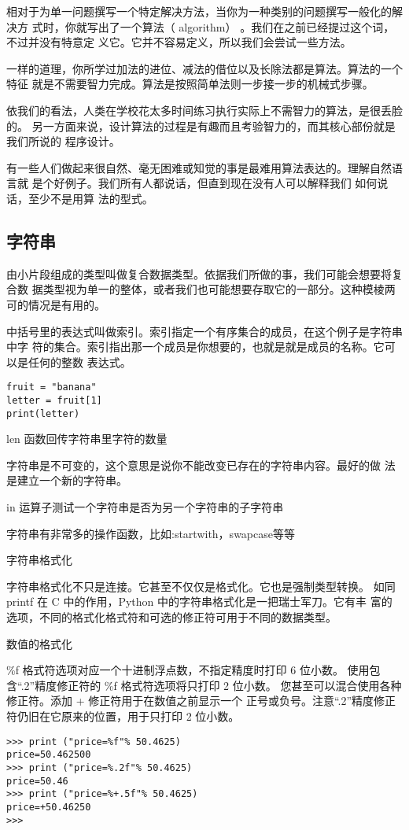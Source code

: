 \documentclass[twoside,11pt]{book}
\begin{document}
相对于为单一问题撰写一个特定解决方法，当你为一种类别的问题撰写一般化的解决方
式时，你就写出了一个算法（ algorithm） 。我们在之前已经提过这个词，不过并没有特意定
义它。它并不容易定义，所以我们会尝试一些方法。

一样的道理，你所学过加法的进位、减法的借位以及长除法都是算法。算法的一个特征
就是不需要智力完成。算法是按照简单法则一步接一步的机械式步骤。

依我们的看法，人类在学校花太多时间练习执行实际上不需智力的算法，是很丢脸的。
另一方面来说，设计算法的过程是有趣而且考验智力的，而其核心部份就是我们所说的
程序设计。

有一些人们做起来很自然、毫无困难或知觉的事是最难用算法表达的。理解自然语言就
是个好例子。我们所有人都说话，但直到现在没有人可以解释我们 如何说话，至少不是用算
法的型式。

\subsection{字符串}
由小片段组成的类型叫做复合数据类型。依据我们所做的事，我们可能会想要将复合数
据类型视为单一的整体，或者我们也可能想要存取它的一部分。这种模棱两可的情况是有用的。


中括号里的表达式叫做索引。索引指定一个有序集合的成员，在这个例子是字符串中字
符的集合。索引指出那一个成员是你想要的，也就是就是成员的名称。它可以是任何的整数
表达式。
\begin{lstlisting}
fruit = "banana"
letter = fruit[1]
print(letter)
\end{lstlisting}

len 函数回传字符串里字符的数量

字符串是不可变的，这个意思是说你不能改变已存在的字符串内容。最好的做
法是建立一个新的字符串。

in 运算子测试一个字符串是否为另一个字符串的子字符串

字符串有非常多的操作函数，比如:startwith，swapcase等等

字符串格式化

字符串格式化不只是连接。它甚至不仅仅是格式化。它也是强制类型转换。
如同 printf 在 C 中的作用，Python 中的字符串格式化是一把瑞士军刀。它有丰 富的选项，不同的格式化格式符和可选的修正符可用于不同的数据类型。

数值的格式化

\%f 格式符选项对应一个十进制浮点数，不指定精度时打印 6 位小数。
使用包含“.2”精度修正符的 \%f 格式符选项将只打印 2 位小数。
您甚至可以混合使用各种修正符。添加 + 修正符用于在数值之前显示一个 正号或负号。注意“.2”精度修正符仍旧在它原来的位置，用于只打印 2 位小数。
\begin{lstlisting}
>>> print ("price=%f"% 50.4625)
price=50.462500
>>> print ("price=%.2f"% 50.4625)
price=50.46
>>> print ("price=%+.5f"% 50.4625)
price=+50.46250
>>>
\end{lstlisting}
\end{document}
